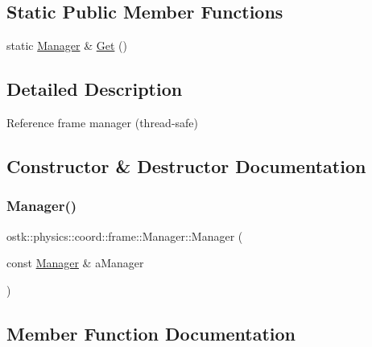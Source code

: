 \subsection*{Static Public Member Functions}
\begin{DoxyCompactItemize}
\item 
static \hyperlink{classostk_1_1physics_1_1coord_1_1frame_1_1_manager}{Manager} \& \hyperlink{classostk_1_1physics_1_1coord_1_1frame_1_1_manager_a58450dcde801cd274f45fd000e5e6bd7}{Get} ()
\end{DoxyCompactItemize}


\subsection{Detailed Description}
Reference frame manager (thread-\/safe) 

\subsection{Constructor \& Destructor Documentation}
\mbox{\label{classostk_1_1physics_1_1coord_1_1frame_1_1_manager_af000e1deebf0cf7f08ffa54d0e2aa854}} 
\subsubsection{\texorpdfstring{Manager()}{Manager()}}
{\footnotesize\ttfamily ostk\+::physics\+::coord\+::frame\+::\+Manager\+::\+Manager (\begin{DoxyParamCaption}\item[{const \hyperlink{classostk_1_1physics_1_1coord_1_1frame_1_1_manager}{Manager} \&}]{a\+Manager }\end{DoxyParamCaption})\hspace{0.3cm}{\ttfamily [delete]}}



\subsection{Member Function Documentation}
\mbox{\label{classostk_1_1physics_1_1coord_1_1frame_1_1_manager_a241b2aea6a86ba5a0ec50a0bf91b4427}} 
